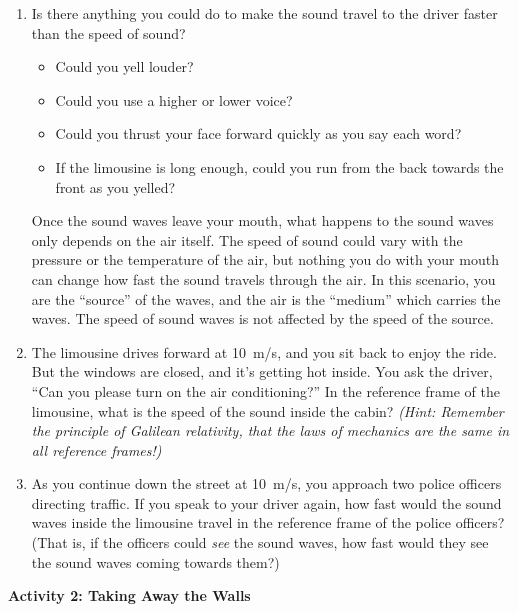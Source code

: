 \begin{enumerate}[labparts]
\item Is there anything you could do to make the sound travel to the driver faster than the speed of sound?
\begin{itemize}
\item Could you yell louder?
\bigskip
\item Could you use a higher or lower voice?
\bigskip
\item Could you thrust your face forward quickly as you say each word?
\bigskip
\item If the limousine is long enough, could you run from the back towards the front as you yelled?
\bigskip
\end{itemize}

Once the sound waves leave your mouth, what happens to the sound waves only depends on the air itself.  The speed of sound could vary with the pressure or the temperature of the air, but nothing you do with your mouth can change how fast the sound travels through the air.  In this scenario, you are the ``source'' of the waves, and the air is the ``medium'' which carries the waves.  The speed of sound waves is not affected by the speed of the source.

\medskip
\item The limousine drives forward at 10~m/s, and you sit back to enjoy the ride.  But the windows are closed, and it's getting hot inside.  You ask the driver, ``Can you please turn on the air conditioning?''
In the reference frame of the limousine, what is the speed of the sound inside the cabin?  \textit{(Hint: Remember the principle of Galilean relativity, that the laws of mechanics are the same in all reference frames!)}
\answerspace{0.8in}

\item As you continue down the street at 10~m/s, you approach two police officers directing traffic.   If you speak to your driver again, how fast would the sound waves inside the limousine travel in the reference frame of the police officers?  (That is, if the officers could \textit{see} the sound waves, how fast would they see the sound waves coming towards them?)
\answerspace{0.8in}
\end{enumerate}

\pagebreak[3]
\textbf{Activity 2: Taking Away the Walls}

